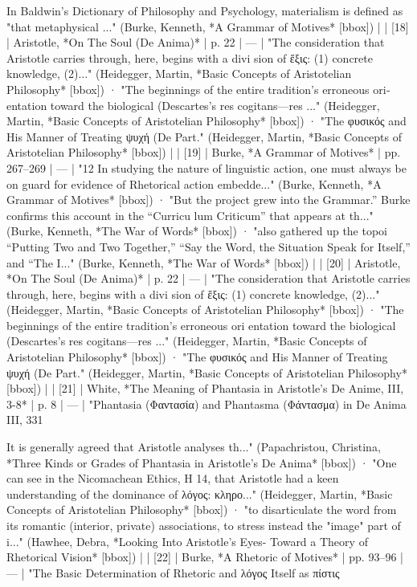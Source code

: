 In Baldwin's Dictionary of Philosophy and Psychology, materialism is defined as "that metaphysical ..." (Burke, Kenneth, *A Grammar of Motives* [bbox]) |
| [18] | Aristotle, *On The Soul (De Anima)* | p. 22 | — | "The consideration that Aristotle carries through, here, begins with a divi­ sion of ἕξις: (1) concrete knowledge, (2)..." (Heidegger, Martin, *Basic Concepts of Aristotelian Philosophy* [bbox]) · "The beginnings of the entire tradition’s erroneous ori­ entation toward the biological (Descartes’s res cogitans—res ..." (Heidegger, Martin, *Basic Concepts of Aristotelian Philosophy* [bbox]) · "The φυσικός and His Manner of Treating ψυχή (De Part." (Heidegger, Martin, *Basic Concepts of Aristotelian Philosophy* [bbox]) |
| [19] | Burke, *A Grammar of Motives* | pp. 267–269 | — | "12 In studying the nature of linguistic action, one must always be on guard for evidence of Rhetorical action embedde..." (Burke, Kenneth, *A Grammar of Motives* [bbox]) · "But the project grew into the Grammar.” Burke confirms this account in the “Curricu­ lum Criticum” that appears at th..." (Burke, Kenneth, *The War of Words* [bbox]) · "also gathered up the topoi “Putting Two and Two Together,” “Say the Word, the Situation Speak for Itself,” and “The I..." (Burke, Kenneth, *The War of Words* [bbox]) |
| [20] | Aristotle, *On The Soul (De Anima)* | p. 22 | — | "The consideration that Aristotle carries through, here, begins with a divi­ sion of ἕξις: (1) concrete knowledge, (2)..." (Heidegger, Martin, *Basic Concepts of Aristotelian Philosophy* [bbox]) · "The beginnings of the entire tradition’s erroneous ori­ entation toward the biological (Descartes’s res cogitans—res ..." (Heidegger, Martin, *Basic Concepts of Aristotelian Philosophy* [bbox]) · "The φυσικός and His Manner of Treating ψυχή (De Part." (Heidegger, Martin, *Basic Concepts of Aristotelian Philosophy* [bbox]) |
| [21] | White, *The Meaning of Phantasia in Aristotle's De Anime, III, 3-8* | p. 8 | — | "Phantasia (Φαντασία) and Phantasma (Φάντασμα) in De Anima III, 331

It is generally agreed that Aristotle analyses th..." (Papachristou, Christina, *Three Kinds or Grades of Phantasia in Aristotle's De Anima* [bbox]) · "One can see in the Nicomachean Ethics, Η 14, that Aristotle had a keen understanding of the dominance of λόγος: κληρο..." (Heidegger, Martin, *Basic Concepts of Aristotelian Philosophy* [bbox]) · "to disarticulate the word from its romantic (interior, private) associations, to stress instead the "image" part of i..." (Hawhee, Debra, *Looking Into Aristotle's Eyes- Toward a Theory of Rhetorical Vision* [bbox]) |
| [22] | Burke, *A Rhetoric of Motives* | pp. 93–96 | — | "The Basic Determination of Rhetoric and λόγος Itself as πίστις

